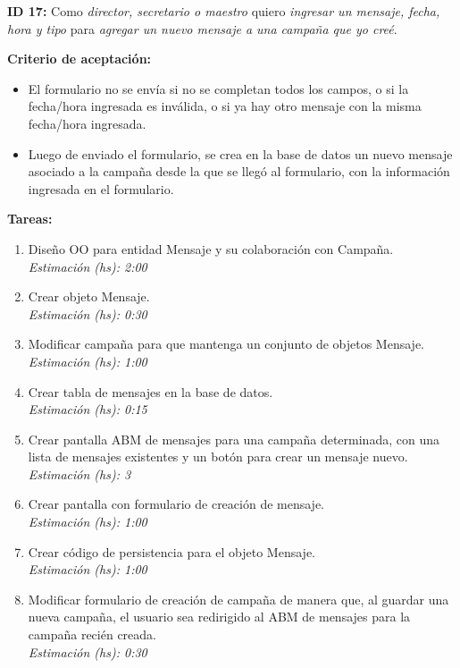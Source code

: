 \documentclass[a4paper, 10pt, twoside]{article}
\newcommand{\sprintstory}[4]{
  \noindent
  \textbf{ID #1:} Como \emph{#2} quiero \emph{#3} para \emph{#4}.
}
\newenvironment{criterios}{
  \textbf{Criterio de aceptación:}
  \begin{itemize}
}{
  \end{itemize}
}
\newcommand{\criterio}[1] {
  \item #1
}
\newenvironment{tasks}{
  \textbf{Tareas:}
  \begin{enumerate}
}{
  \end{enumerate}
}
\newcommand{\task}[2] {
  \item #1.\\
  \emph{Estimación (hs): #2}
}
\begin{document}
%
%
%


\sprintstory{17}
            {director, secretario o maestro}
            {ingresar un mensaje, fecha, hora y tipo}
            {agregar un nuevo mensaje a una campaña que yo creé}

\begin{criterios}
  \criterio{El formulario no se envía si no se completan todos los campos, o si la fecha/hora ingresada es inválida, o si ya hay otro mensaje con la misma fecha/hora ingresada.}
  \criterio{Luego de enviado el formulario, se crea en la base de datos un nuevo mensaje asociado a la campaña desde la que se llegó al formulario, con la información ingresada en el formulario.}
\end{criterios}

\begin{tasks}
  \task{Diseño OO para entidad Mensaje y su colaboración con Campaña}{2:00}
  \task{Crear objeto Mensaje}{0:30}
  \task{Modificar campaña para que mantenga un conjunto de objetos Mensaje}{1:00}
  \task{Crear tabla de mensajes en la base de datos}{0:15}
  \task{Crear pantalla ABM de mensajes para una campaña determinada, con una lista de mensajes existentes y un botón para crear un mensaje nuevo}{3}
  \task{Crear pantalla con formulario de creación de mensaje}{1:00}
  \task{Crear código de persistencia para el objeto Mensaje}{1:00}
  \task{Modificar formulario de creación de campaña de manera que, al guardar una nueva campaña, el usuario sea redirigido al ABM de mensajes para la campaña recién creada}{0:30}
\end{tasks}
\end{document}
